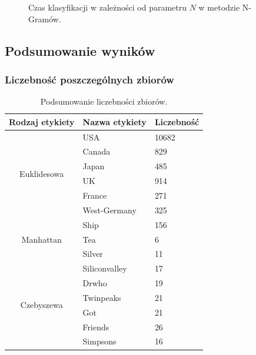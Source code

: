 \documentclass{classrep}
\begin{document}
\begin{figure}[h!]
    \begin{center}
    \end{center}
    \caption{Czas klasyfikacji w zależności od parametru $N$ w metodzie N-Gramów.}
    \label{n_gramn_czas}
\end{figure}

\FloatBarrier
\subsection{Podsumowanie wyników}

\subsubsection{Liczebność poszczególnych zbiorów}
\begin{table}[!ht]
    \centering
    \begin{tabular}{|c|l|l|}
        \hline
        \multicolumn{1}{|l|}{\textbf{Rodzaj etykiety}} & \textbf{Nazwa etykiety} & \textbf{Liczebność} \\ \hline
        \multirow{6}{*}{Euklidesowa} & USA & 10682 \\ \cline{2-3}
        & Canada & 829 \\ \cline{2-3}
        & Japan & 485 \\ \cline{2-3}
        & UK & 914 \\ \cline{2-3}
        & France & 271 \\ \cline{2-3}
        & West-Germany & 325 \\ \hline
        \multirow{3}{*}{Manhattan} & Ship & 156 \\ \cline{2-3}
        & Tea & 6 \\ \cline{2-3}
        & Silver & 11 \\ \hline
        \multirow{6}{*}{Czebyszewa} & Siliconvalley & 17 \\ \cline{2-3}
        & Drwho & 19 \\ \cline{2-3}
        & Twinpeaks & 21 \\ \cline{2-3}
        & Got & 21 \\ \cline{2-3}
        & Friends & 26 \\ \cline{2-3}
        & Simpsons & 16 \\ \hline
    \end{tabular}
    \caption{Podsumowanie liczebności zbiorów.}
\end{table}
\end{document}
